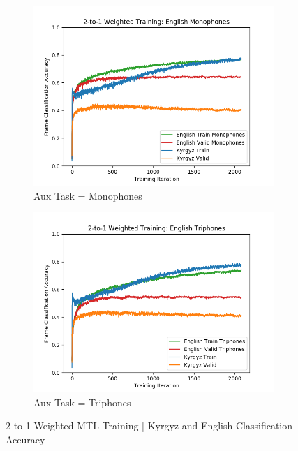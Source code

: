 \documentclass[a4paper]{article}
\begin{document}
\begin{figure}[!htbp]
\centering
\begin{subfigure}{.25\textwidth}
  \centering
  \includegraphics[width=1.1\textwidth,keepaspectratio]{figs/2-to-1-mono.png}
  \caption{Aux Task = Monophones}
  \label{fig:sub1}
\end{subfigure}%
\begin{subfigure}{.25\textwidth}
  \centering
  \includegraphics[width=1.1\textwidth,keepaspectratio]{figs/2-to-1-tri.png}
  \caption{Aux Task = Triphones}
  \label{fig:sub2}
\end{subfigure}
\caption{2-to-1 Weighted MTL Training | Kyrgyz and English Classification Accuracy}
\label{fig:2-to-1}
\end{figure}
\end{document}
